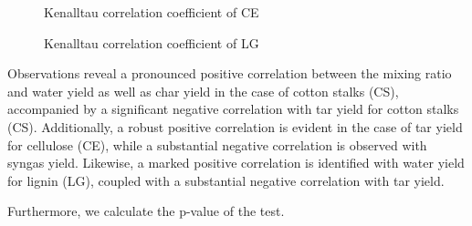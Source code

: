\documentclass{swmcmthesis}
\begin{document}
\begin{figure}[h!t]
    \centering
    \hfill
    \caption{Kenalltau correlation coefficient of CE}
\end{figure}

\begin{figure}[h!t]
    \centering
    \hfill
    \caption{Kenalltau correlation coefficient of LG}
\end{figure}

Observations reveal a pronounced positive correlation between the mixing ratio and water yield as well as char yield in the case of cotton stalks (CS), accompanied by a significant negative correlation with tar yield for cotton stalks (CS). Additionally, a robust positive correlation is evident in the case of tar yield for cellulose (CE), while a substantial negative correlation is observed with syngas yield. Likewise, a marked positive correlation is identified with water yield for lignin (LG), coupled with a substantial negative correlation with tar yield.

Furthermore, we calculate the p-value of the test.
\end{document}
